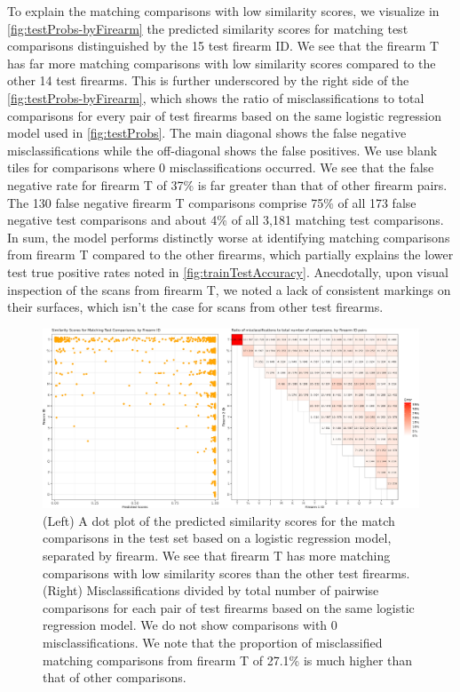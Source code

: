 \documentclass[reprint]{JASA}
\begin{document}
To explain the matching comparisons with low similarity scores, we
visualize in \autoref{fig:testProbs-byFirearm} the predicted similarity
scores for matching test comparisons distinguished by the 15 test
firearm ID. We see that the firearm T has far more matching comparisons
with low similarity scores compared to the other 14 test firearms. This
is further underscored by the right side of the
\autoref{fig:testProbs-byFirearm}, which shows the ratio of
misclassifications to total comparisons for every pair of test firearms
based on the same logistic regression model used in
\autoref{fig:testProbs}. The main diagonal shows the false negative
misclassifications while the off-diagonal shows the false positives. We
use blank tiles for comparisons where 0 misclassifications occurred. We
see that the false negative rate for firearm T of 37\% is far greater
than that of other firearm pairs. The 130 false negative firearm T
comparisons comprise 75\% of all 173 false negative test comparisons and
about 4\% of all 3,181 matching test comparisons. In sum, the model
performs distinctly worse at identifying matching comparisons from
firearm T compared to the other firearms, which partially explains the
lower test true positive rates noted in \autoref{fig:trainTestAccuracy}.
Anecdotally, upon visual inspection of the scans from firearm T, we
noted a lack of consistent markings on their surfaces, which isn't the
case for scans from other test firearms.

\begin{figure}[htbp]

{\centering \includegraphics[width=\textwidth]{images/resultsPlots/misclassifPlt} 

}

\caption{\label{fig:testProbs-byFirearm} (Left) A dot plot of the predicted similarity scores for the match comparisons in the test set based on a logistic regression model, separated by firearm. We see that firearm T has more matching comparisons with low similarity scores than the other test firearms. (Right) Misclassifications divided by total number of pairwise comparisons for each pair of test firearms based on the same logistic regression model. We do not show comparisons with 0 misclassifications. We note that the proportion of misclassified matching comparisons from firearm T of 27.1\% is much higher than that of other comparisons.}\label{fig:unnamed-chunk-11}
\end{figure}
\end{document}
